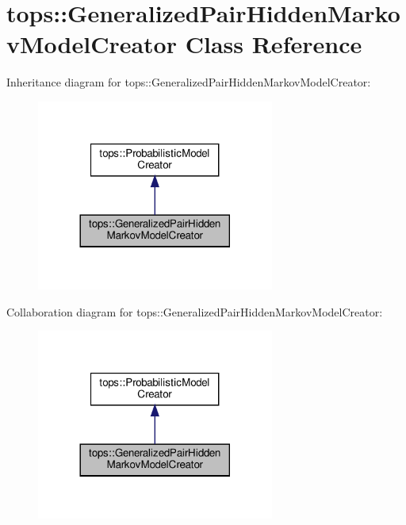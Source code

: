 \hypertarget{classtops_1_1GeneralizedPairHiddenMarkovModelCreator}{}\section{tops\+:\+:Generalized\+Pair\+Hidden\+Markov\+Model\+Creator Class Reference}
\label{classtops_1_1GeneralizedPairHiddenMarkovModelCreator}


Inheritance diagram for tops\+:\+:Generalized\+Pair\+Hidden\+Markov\+Model\+Creator\+:
\nopagebreak
\begin{figure}[H]
\begin{center}
\leavevmode
\includegraphics[width=221pt]{classtops_1_1GeneralizedPairHiddenMarkovModelCreator__inherit__graph}
\end{center}
\end{figure}


Collaboration diagram for tops\+:\+:Generalized\+Pair\+Hidden\+Markov\+Model\+Creator\+:
\nopagebreak
\begin{figure}[H]
\begin{center}
\leavevmode
\includegraphics[width=221pt]{classtops_1_1GeneralizedPairHiddenMarkovModelCreator__coll__graph}
\end{center}
\end{figure}
